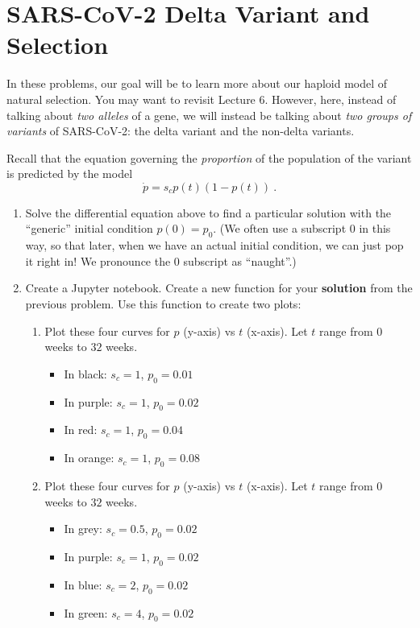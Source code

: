 \documentclass[11pt,onecolumn,superscriptaddress,notitlepage]{article}
\begin{document}
\clearpage
\section*{SARS-CoV-2 Delta Variant and Selection} 

In these problems, our goal will be to learn more about our haploid model of natural selection. You may want to revisit Lecture 6. However, here, instead of talking about {\it two alleles} of a gene, we will instead be talking about {\it two groups of variants} of SARS-CoV-2: the delta variant and the non-delta variants.

Recall that the equation governing the {\it proportion} of the population of the variant is predicted by the model $$\dot{p} = s_c p(t)\left(1-p(t) \right) \ .$$

\begin{enumerate}[resume]
	\item Solve the differential equation above to find a particular solution with the ``generic'' initial condition $p(0) = p_0$. (We often use a subscript $0$ in this way, so that later, when we have an actual initial condition, we can just pop it right in! We pronounce the $0$ subscript as ``naught''.)
	\item Create a Jupyter notebook. Create a new function for your {\bf solution} from the previous problem. Use this function to create two plots:
	\begin{enumerate}
		\item Plot these four curves for $p$ (y-axis) vs $t$ (x-axis). Let $t$ range from $0$ weeks to $32$ weeks. 
		\begin{itemize}
			\item In black: $s_c = 1$, $p_0 = 0.01$
			\item In purple: $s_c = 1$, $p_0 = 0.02$
			\item In red: $s_c = 1$, $p_0 = 0.04$
			\item In orange: $s_c = 1$, $p_0 = 0.08$
		\end{itemize}
				\item Plot these four curves for $p$ (y-axis) vs $t$ (x-axis). Let $t$ range from $0$ weeks to $32$ weeks. 
		\begin{itemize}
			\item	In grey: $s_c = 0.5$, $p_0 = 0.02$
			\item In purple: $s_c = 1$, $p_0 = 0.02$
			\item In blue: $s_c = 2$, $p_0 = 0.02$
			\item In green: $s_c = 4$, $p_0 = 0.02$

\end{itemize}
\end{enumerate}
\end{enumerate}
\end{document}

